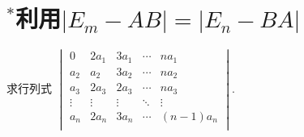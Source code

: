 \section{$^*$利用$|E_m-AB|=|E_n-BA|$} \label{sec:14:利用}

\begin{example}
    求行列式 $\begin{vmatrix}
            0      & 2a_1   & 3a_1   & \cdots & na_1     \\
            a_2    & a_2    & 3a_2   & \cdots & na_2     \\
            a_3    & 2a_3   & 2a_3   & \cdots & na_3     \\
            \vdots & \vdots & \vdots & \ddots & \vdots   \\
            a_n    & 2a_n   & 3a_n   & \cdots & (n-1)a_n \\
        \end{vmatrix}$.
\end{example}

